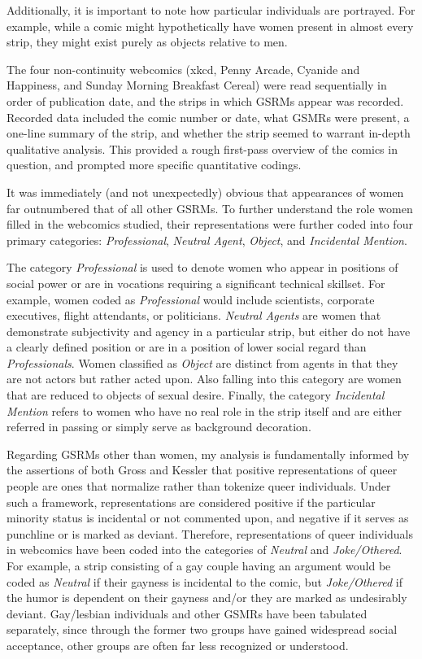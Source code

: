 \documentclass[man,12pt]{apa6}
\begin{document}
Additionally, it is important to note how particular individuals are portrayed. For example, while a comic might hypothetically have women present in almost every strip, they might exist purely as objects relative to men. 

The four non-continuity webcomics (xkcd, Penny Arcade, Cyanide and Happiness, and Sunday Morning Breakfast Cereal) were read sequentially in order of publication date, and the strips in which GSRMs appear was recorded. Recorded data included the comic number or date, what GSMRs were present, a one-line summary of the strip, and whether the strip seemed to warrant in-depth qualitative analysis. This provided a rough first-pass overview of the comics in question, and prompted more specific quantitative codings.

It was immediately (and not unexpectedly) obvious that appearances of women far outnumbered that of all other GSRMs. To further understand the role women filled in the webcomics studied, their representations were further coded into four primary categories: \emph{Professional}, \emph{Neutral Agent}, \emph{Object}, and \emph{Incidental Mention}.

The category \emph{Professional} is used to denote women who appear in positions of social power or are in vocations requiring a significant technical skillset. For example, women coded as \emph{Professional} would include  scientists, corporate executives, flight attendants, or politicians. \emph{Neutral Agents} are women that demonstrate subjectivity and agency in a particular strip, but either do not have a clearly defined position or are in a position of lower social regard than \emph{Professionals}. Women classified as \emph{Object} are distinct from agents in that they are not actors but rather acted upon. Also falling into this category are women that are reduced to objects of sexual desire. Finally, the category \emph{Incidental Mention} refers to women who have no real role in the strip itself and are either referred in passing or simply serve as background decoration.

 Regarding GSRMs other than women, my analysis is fundamentally informed by the assertions of both Gross \citeyear{gross} and Kessler\citeyear{queermediocrity} that positive representations of queer people are ones that normalize rather than tokenize queer individuals. Under such a framework, representations are considered positive if the particular minority status is incidental or not commented upon, and negative if it serves as punchline or is marked as deviant. Therefore, representations of queer individuals in webcomics have been coded into the categories of \emph{Neutral} and \emph{Joke/Othered}. For example, a strip consisting of a gay couple having an argument would be coded as \emph{Neutral} if their gayness is incidental to the comic, but \emph{Joke/Othered} if the humor is dependent on their gayness and/or they are marked as undesirably deviant. Gay/lesbian individuals and other GSMRs have been tabulated separately, since through the former two groups have gained widespread social acceptance, other groups are often far less recognized or understood. 
\end{document}
